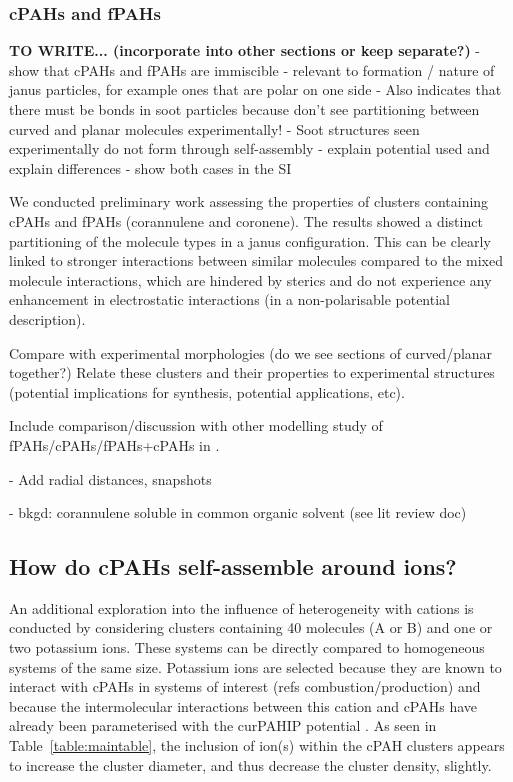 \subsubsection{cPAHs and fPAHs}
\textbf{TO WRITE... (incorporate into other sections or keep separate?)}
- show that cPAHs and fPAHs are immiscible 
- relevant to formation / nature of janus particles, for example ones that are polar on one side
- Also indicates that there must be bonds in soot particles because don’t see partitioning between curved and planar molecules experimentally!
- Soot structures seen experimentally do not form through self-assembly
- explain potential used and explain differences - show both cases in the SI

We conducted preliminary work assessing the properties of clusters containing cPAHs and fPAHs (corannulene and coronene). The results showed a distinct partitioning of the molecule types in a janus configuration. This can be clearly linked to stronger interactions between similar molecules compared to the mixed molecule interactions, which are hindered by sterics and do not experience any enhancement in electrostatic interactions (in a non-polarisable potential description).

Compare with experimental morphologies (do we see sections of curved/planar together?)
Relate these clusters and their properties to experimental structures (potential implications for synthesis, potential applications, etc).

Include comparison/discussion with other modelling study of fPAHs/cPAHs/fPAHs+cPAHs in \cite{zhang2020molecular}.

- Add radial distances, snapshots

- bkgd: corannulene soluble in common organic solvent (see lit review doc)


\subsection{How do cPAHs self-assemble around ions?}
An additional exploration into the influence of heterogeneity with cations is conducted by considering clusters containing 40 molecules (A or B) and one or two potassium ions.  These systems can be directly compared to homogeneous systems of the same size. Potassium ions are selected because they are known to interact with cPAHs in systems of interest (refs combustion/production) and because the intermolecular interactions between this cation and cPAHs have already been parameterised with the curPAHIP potential \cite{bowal2019ion}. As seen in Table~\ref{table:maintable},
the inclusion of ion(s) within the cPAH clusters appears to increase the cluster diameter, and thus decrease the cluster density, slightly.

